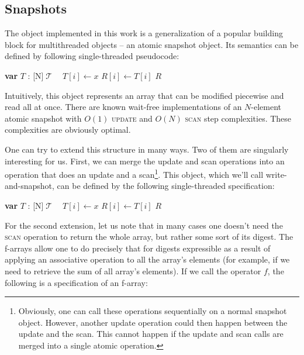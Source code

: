 \documentclass[a4paper,11pt]{article}
\def\T{\ensuremath{\operatorname{\mathcal{T}}}\text{ }}
\newcommand{\fn}[1]{\textsc{#1}}
\newcommand{\var}[2]{\textbf{var }#1 : #2}
\newcommand{\arrayspec}[1]{\text{array}[#1]\text{ of }}
\begin{document}
\subsection{Snapshots}

The object implemented in this work is a generalization of a popular building block for multithreaded objects
-- an atomic snapshot object\cite{snapshot-idea}. Its semantics can be defined by following single-threaded pseudocode:

\begin{algorithmic}[1]
	\State\var{$T$}{\arrayspec{N}$\T$}
	\State $T[i] \gets x$
\EndFunction
{}
		\State $R[i] \gets T[i]$
	\EndFor
	\State\Return $R$
\EndFunction
\end{algorithmic}

Intuitively, this object represents an array that can be modified piecewise and read all at once.
There are known wait-free implementations of an $N$-element atomic snapshot with $O(1)$ \fn{update} and $O(N)$ \fn{scan} step complexities\cite{snapshot-impl}. These complexities are obviously
optimal.

One can try to extend this structure in many ways. Two of them are singularly interesting for us.
First, we can merge the update and scan operations
into an operation that does an update and a scan\footnote{Obviously, one can call these operations sequentially
on a normal snapshot object. However, another update operation could then happen between the update and the scan.
This cannot happen if the update and scan calls are merged into a single atomic operation.}.
This object, which we'll call write-and-snapshot\cite{write-and-snap}, can be defined by the following single-threaded specification:

\begin{algorithmic}[1]
	\State\var{$T$}{\arrayspec{N}$\T$}
	\State $T[i] \gets x$
		\State $R[i] \gets T[i]$
	\EndFor
	\State\Return $R$
\EndFunction
\end{algorithmic}

For the second extension, let us note that in many cases one doesn't need the \fn{scan} operation to return the whole array, but rather some sort of its digest. The f-arrays\cite{f-array} allow one to do precisely that for digests expressible as
a result of applying an associative operation to all the array's elements (for example, if we need to retrieve the sum of all array's elements). If we call the operator $f$, the following is a specification of an f-array:
\end{document}

